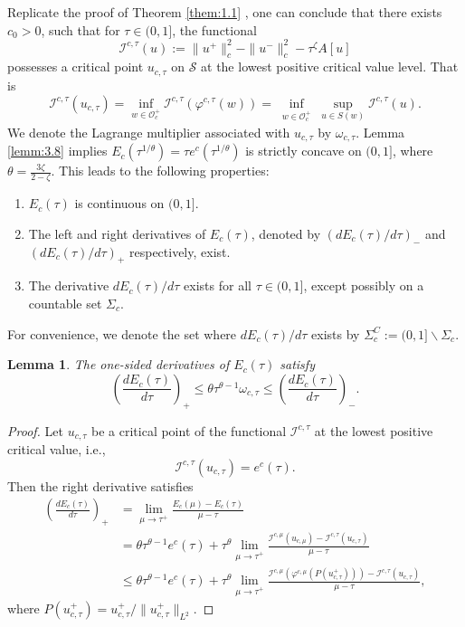 \documentclass{amsart}
\theoremstyle{plain}
\newtheorem{lemma}[theorem]{Lemma}
\theoremstyle{definition}
\theoremstyle{remark}
\numberwithin{equation}{section} \numberwithin{figure}{section}
\begin{document}
{Replicate the proof of Theorem \ref{them:1.1}
, one can conclude that there exists $c_0 >0$,  such that for $\tau\in (0,1]$, the functional
$$\mathcal{I}^{c, \tau}({u}):= \|u^+\|_c^2-\| u^-\|_c^2- \tau^\zeta A[u] $$
possesses a critical point $u_{c,\tau}$ on $\mathcal{S}$
at the lowest positive critical value level. 
That is 
$$
\mathcal{I}^{c,\tau}(u_{c,\tau}) =
\inf_{w\in \mathcal{O}_c^{+}}\mathcal{I}^{c, \tau}(\varphi^{c,\tau}(w))=
\inf _{\substack{w \in \mathcal{O}_c^+  }} \sup _{{u} \in   S(w)} \mathcal{I}^{c, \tau }({u}).
$$
We denote the Lagrange multiplier  associated with $u_{c,\tau}$ by $\omega_{c, \tau}$.
 Lemma \ref{lemm:3.8} implies ${E}_c(\tau^{1/\theta})=
 \tau e^c(\tau^{1/\theta})$ is 
 strictly concave on $(0, 1]$, where $\theta= \frac{3\zeta}{2-\zeta}$.
 This leads to the following properties:
 \begin{enumerate}
 \item ${E}_c(\tau)$ is continuous on $(0, 1]$.
 \item The left and right derivatives of ${E}_c(\tau)$, denoted by $(d{E}_c(\tau)/d\tau)_-$ and $(d {E}_c(\tau)/d\tau)_+$ respectively, exist.
 \item The derivative $d {E}_c(\tau)/d\tau$ exists for all $\tau \in (0, 1]$, except possibly on a countable set $\Sigma_c$.
 \end{enumerate}
For convenience, we denote the set where $d {E}_c(\tau)/ d \tau$
exists by $\Sigma_c^C := (0,1]\backslash \Sigma_c$.
\begin{lemma}\label{lemm:uniq}
  The one-sided derivatives of \( E_c(\tau) \) satisfy
  \[
  \left(\frac{d E_c(\tau)}{d \tau}\right)_+ \leq \theta \tau^{\theta - 1} \omega_{c,\tau} \leq \left(\frac{d E_c(\tau)}{d \tau}\right)_-.
  \]
\end{lemma}

\begin{proof}
Let \( u_{c, \tau} \) be a critical point of the functional \( \mathcal{I}^{c,\tau} \) at the lowest positive critical value, i.e.,
\[
\mathcal{I}^{c,\tau}(u_{c, \tau}) = e^c(\tau).
\]
Then the right derivative satisfies
\begin{align*}
\left(\frac{d E_c(\tau)}{d \tau}\right)_+ 
&= \lim_{\mu \to \tau^+} \frac{E_c(\mu) - E_c(\tau)}{\mu - \tau} \\
&= \theta \tau^{\theta - 1} e^c(\tau) + \tau^\theta \lim_{\mu \to \tau^+} \frac{\mathcal{I}^{c, \mu}(u_{c, \mu}) - \mathcal{I}^{c, \tau}(u_{c, \tau})}{\mu - \tau} \\
&\leq \theta \tau^{\theta - 1} e^c(\tau) + \tau^\theta \lim_{\mu \to \tau^+} \frac{\mathcal{I}^{c, \mu}(\varphi^{c, \mu}(P(u_{c, \tau}^+))) - \mathcal{I}^{c, \tau}(u_{c, \tau})}{\mu - \tau},
\end{align*}
where \( P(u_{c, \tau}^+) = u_{c, \tau}^+ / \|u_{c, \tau}^+\|_{L^2} \).


\end{proof}}
\end{document}

